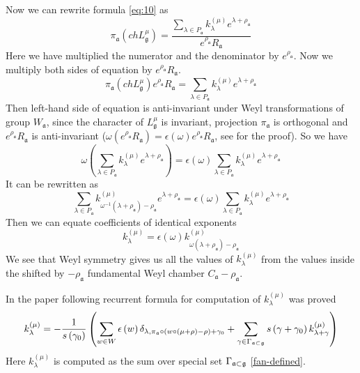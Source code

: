 \documentclass[a4paper,12pt]{article}
\theoremstyle{definition} \newtheorem{Def}{Definition}
\begin{document}
Now we can rewrite formula \eqref{eq:10} as
\begin{equation}
  \label{eq:13}
  \pi_{\mathfrak{a}}(ch L^{\mu}_{\mathfrak{g}})=
  \frac{\sum_{\lambda\in P_{\mathfrak{a}}}k_{\lambda}^{(\mu)}e^{\lambda+\rho_{\mathfrak{a}}}}{e^{\rho_{\mathfrak{a}}}R_{\mathfrak{a}}}
\end{equation}
Here we have multiplied the numerator and the denominator by $e^{\rho_{\mathfrak{a}}}$. Now we multiply both sides of equation by ${e^{\rho_{\mathfrak{a}}}R_{\mathfrak{a}}}$.
\begin{equation}
  \label{eq:14}
   \pi_{\mathfrak{a}}(ch L^{\mu}_{\mathfrak{g}})e^{\rho_{\mathfrak{a}}}R_{\mathfrak{a}}=
  \sum_{\lambda\in P_{\mathfrak{a}}}k_{\lambda}^{(\mu)}e^{\lambda+\rho_{\mathfrak{a}}}
\end{equation}
Then left-hand side of equation is anti-invariant under Weyl transformations of group $W_{\mathfrak{a}}$, since the character of $L^{\mu}_{\mathfrak{g}}$ is invariant, projection $\pi_{\mathfrak{a}}$ is orthogonal and $e^{\rho_{\mathfrak{a}}}R_{\mathfrak{a}}$ is anti-invariant ($\omega(e^{\rho_{\mathfrak{a}}}R_{\mathfrak{a}})=\epsilon(\omega)e^{\rho_{\mathfrak{a}}}R_{\mathfrak{a}}$, see \cite{wakimoto2001idl} for the proof). So we have
\begin{equation}
  \label{eq:15}
  \omega\left(\sum_{\lambda\in P_{\mathfrak{a}}}k_{\lambda}^{(\mu)}e^{\lambda+\rho_{\mathfrak{a}}}\right)=
  \epsilon(\omega)\sum_{\lambda\in P_{\mathfrak{a}}}k_{\lambda}^{(\mu)}e^{\lambda+\rho_{\mathfrak{a}}}
\end{equation}
It can be rewritten as
\begin{equation}
  \label{eq:16}
 \sum_{\lambda\in P_{\mathfrak{a}}}k_{\omega^{-1}(\lambda+\rho_{\mathfrak{a}})-\rho_{\mathfrak{a}}}^{(\mu)}e^{\lambda+\rho_{\mathfrak{a}}}=
  \epsilon(\omega)\sum_{\lambda\in P_{\mathfrak{a}}}k_{\lambda}^{(\mu)}e^{\lambda+\rho_{\mathfrak{a}}}
\end{equation}
Then we can equate coefficients of identical exponents
\begin{equation}
  \label{eq:17}
  k_{\lambda}^{(\mu)}=\epsilon(\omega)k_{\omega(\lambda+\rho_{\mathfrak{a}})-\rho_{\mathfrak{a}}}^{(\mu)}
\end{equation}
We see that Weyl symmetry gives us all the values of $k_{\lambda}^{(\mu)}$ from the values inside the shifted by $-\rho_{\mathfrak{a}}$ fundamental Weyl chamber $C_{\mathfrak{a}}-\rho_{\mathfrak{a}}$. 

In the paper \cite{ilyin812pbc} following recurrent formula for computation of $k_{\lambda}^{(\mu)}$ was proved
\begin{equation}
  \label{recurrent-relation}
  k_{\lambda }^{\left( \mu \right) }=-\frac{1}{s\left( \gamma _{0}\right) }\left(
\sum_{w\in W}\epsilon \left( w\right) \delta _{\lambda ,\pi _{\frak{a}}\circ
\left( w\circ (\mu +\rho )-\rho \right) +\gamma _{0}}+\sum_{\gamma \in
\Gamma _{\frak{a}\subset \frak{g}}}s\left( \gamma +\gamma _{0}\right) k_{\lambda
+\gamma }^{\left( \mu \right) }\right)   
\end{equation}
Here $k_{\lambda}^{(\mu)}$ is computed as the sum over special set $\Gamma _{\frak{a}\subset \frak{g}}$ \eqref{fan-defined}.
\end{document}
